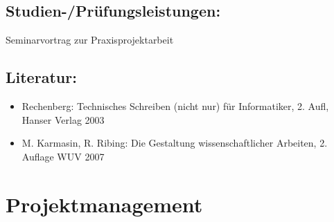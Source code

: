 \section*{Studien-/Prüfungsleistungen:}\label{studien-pruxfcfungsleistungen-17}

Seminarvortrag zur Praxisprojektarbeit

\section*{Literatur:}\label{literatur-15}

\begin{itemize}
\item
  Rechenberg: Technisches Schreiben (nicht nur) für Informatiker, 2.
  Aufl, Hanser Verlag 2003
\item
  M. Karmasin, R. Ribing: Die Gestaltung wissenschaftlicher Arbeiten, 2.
  Auflage WUV 2007
\end{itemize}

\chapter{Projektmanagement}\label{projektmanagement}


